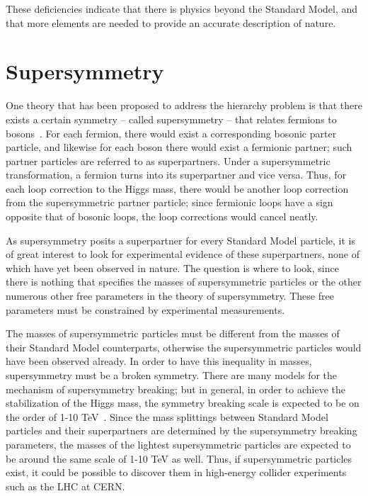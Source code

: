 These deficiencies indicate that there is physics beyond the Standard Model, and that more elements are needed to provide an accurate description of nature.

\section{Supersymmetry\label{sec:SUSY}}

One theory that has been proposed to address the hierarchy problem is that there exists a certain symmetry -- called supersymmetry -- that relates fermions to bosons~\cite{Martin:1997ns}. For each fermion, there would exist a corresponding bosonic parter particle, and likewise for each boson there would exist a fermionic partner; such partner particles are referred to as superpartners. Under a supersymmetric transformation, a fermion turns into its superpartner and vice versa. Thus, for each loop correction to the Higgs mass, there would be another loop correction from the supersymmetric partner particle; since fermionic loops have a sign opposite that of bosonic loops, the loop corrections would cancel neatly.

As supersymmetry posits a superpartner for every Standard Model particle, it is of great interest to look for experimental evidence of these superpartners, none of which have yet been observed in nature. The question is where to look, since there is nothing that specifies the masses of supersymmetric particles or the other numerous other free parameters in the theory of supersymmetry. These free parameters must be constrained by experimental measurements.

The masses of supersymmetric particles must be different from the masses of their Standard Model counterparts, otherwise the supersymmetric particles would have been observed already. In order to have this inequality in masses, supersymmetry must be a broken symmetry. There are many models for the mechanism of supersymmetry breaking; but in general, in order to achieve the stabilization of the Higgs mass, the symmetry breaking scale is expected to be on the order of 1-10 TeV~\cite{Aitchison:2005cf}. Since the mass splittings between Standard Model particles and their superpartners are determined by the supersymmetry breaking parameters, the masses of the lightest supersymmetric particles are  expected to be around the same scale of 1-10 TeV as well. Thus, if supersymmetric particles exist, it could be possible to discover them in high-energy collider experiments such as the LHC at CERN.

